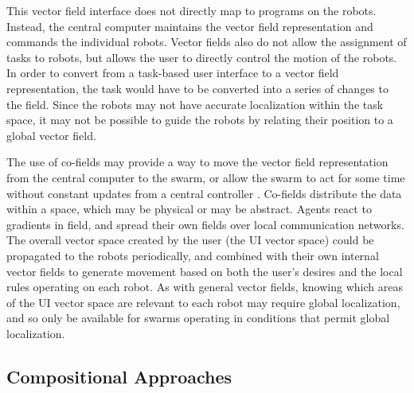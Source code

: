 This vector field interface does not directly map to programs on the robots. 
Instead, the central computer maintains the vector field representation and commands the individual robots.
Vector fields also do not allow the assignment of tasks to robots, but allows the user to directly control the motion of the robots. 
In order to convert from a task-based user interface to a vector field representation, the task would have to be converted into a series of changes to the field.
Since the robots may not have accurate localization within the task space, it may not be possible to guide the robots by relating their position to a global vector field. 

The use of co-fields may provide a way to move the vector field representation from the central computer to the swarm, or allow the swarm to act for some time without constant updates from a central controller \citep{mamei2003co}.
Co-fields distribute the data within a space, which may be physical or may be abstract. 
Agents react to gradients in field, and spread their own fields over local communication networks. 
The overall vector space created by the user (the UI vector space) could be propagated to the robots periodically, and combined with their own internal vector fields to generate movement based on both the user's desires and the local rules operating on each robot. 
As with general vector fields, knowing which areas of the UI vector space are relevant to each robot may require global localization, and so only be available for swarms operating in conditions that permit global localization. 

\subsection{Compositional Approaches} \label{section:Compositional_Approaches}

